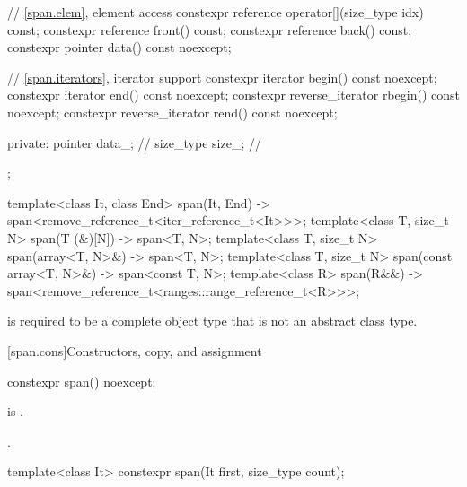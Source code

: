 \begin{codeblock}
{{    // \ref{span.elem}, element access
    constexpr reference operator[](size_type idx) const;
    constexpr reference front() const;
    constexpr reference back() const;
    constexpr pointer data() const noexcept;

    // \ref{span.iterators}, iterator support
    constexpr iterator begin() const noexcept;
    constexpr iterator end() const noexcept;
    constexpr reverse_iterator rbegin() const noexcept;
    constexpr reverse_iterator rend() const noexcept;

  private:
    pointer data_;              // \expos
    size_type size_;            // \expos
  };

  template<class It, class End>
    span(It, End) -> span<remove_reference_t<iter_reference_t<It>>>;
  template<class T, size_t N>
    span(T (&)[N]) -> span<T, N>;
  template<class T, size_t N>
    span(array<T, N>&) -> span<T, N>;
  template<class T, size_t N>
    span(const array<T, N>&) -> span<const T, N>;
  template<class R>
    span(R&&) -> span<remove_reference_t<ranges::range_reference_t<R>>>;
}
\end{codeblock}

\pnum
{} is required to be
a complete object type that is not an abstract class type.

[span.cons]{Constructors, copy, and assignment}

%
\begin{itemdecl}
constexpr span() noexcept;
\end{itemdecl}

\begin{itemdescr}
\pnum
\constraints
{} is .

\pnum
\ensures
{}.
\end{itemdescr}

%
\begin{itemdecl}
template<class It>
  constexpr span(It first, size_type count);
\end{itemdecl}

